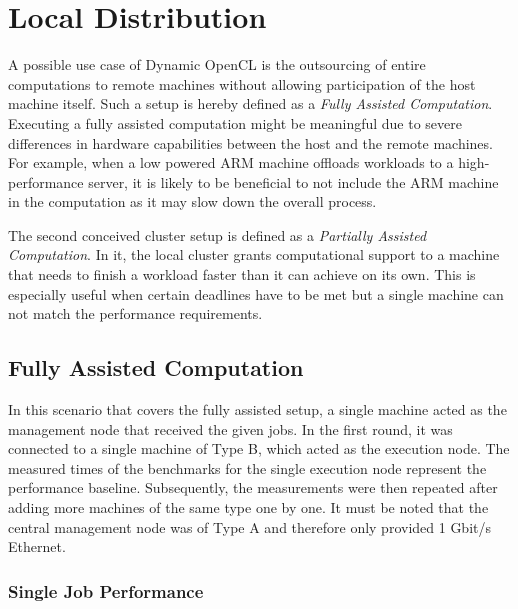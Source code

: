 \section{Local Distribution}
\label{local_distribution}
A possible use case of Dynamic OpenCL is the outsourcing of entire computations to remote machines without allowing participation of the host machine itself. Such a setup is hereby defined as a \textit{Fully Assisted Computation}. Executing a fully assisted computation might be meaningful due to severe differences in hardware capabilities between the host and the remote machines. For example, when a low powered ARM machine offloads workloads to a high-performance server, it is likely to be beneficial to not include the ARM machine in the computation as it may slow down the overall process.

The second conceived cluster setup is defined as a \textit{Partially Assisted Computation}. In it, the local cluster grants computational support to a machine that needs to finish a workload faster than it can achieve on its own. This is especially useful when certain deadlines have to be met but a single machine can not match the performance requirements.

\subsection{Fully Assisted Computation}
In this scenario that covers the fully assisted setup, a single machine acted as the management node that received the given jobs. In the first round, it was connected to a single machine of Type B, which acted as the execution node. The measured times of the benchmarks for the single execution node represent the performance baseline. Subsequently, the measurements were then repeated after adding more machines of the same type one by one. It must be noted that the central management node was of Type A and therefore only provided 1 Gbit/s Ethernet.

\subsubsection*{Single Job Performance}


